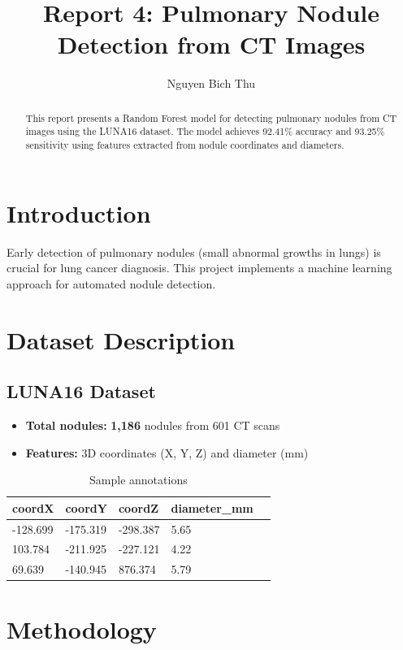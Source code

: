 \documentclass{article}
\title{Report 4: Pulmonary Nodule Detection from CT Images}
\author{Nguyen Bich Thu}
\date{}
\begin{document}
\maketitle

\begin{abstract}
This report presents a Random Forest model for detecting pulmonary nodules from CT images using the LUNA16 dataset. The model achieves 92.41\% accuracy and 93.25\% sensitivity using features extracted from nodule coordinates and diameters.
\end{abstract}

\section{Introduction}
Early detection of pulmonary nodules (small abnormal growths in lungs) is crucial for lung cancer diagnosis. This project implements a machine learning approach for automated nodule detection.

\section{Dataset Description}
\subsection{LUNA16 Dataset}
\begin{itemize}
    \item \textbf{Total nodules:} \textbf{1,186} nodules from 601 CT scans
    \item \textbf{Features:} 3D coordinates (X, Y, Z) and diameter (mm)
\end{itemize}

\begin{table}[H]
\centering
\begin{tabular}{@{}lllll@{}}
\toprule
\textbf{coordX} & \textbf{coordY} & \textbf{coordZ} & \textbf{diameter\_mm} \\
\midrule
-128.699 & -175.319 & -298.387 & 5.65 \\
103.784 & -211.925 & -227.121 & 4.22 \\
69.639 & -140.945 & 876.374 & 5.79 \\
\bottomrule
\end{tabular}
\caption{Sample annotations}
\label{tab:data}
\end{table}

\section{Methodology}
\end{document}
